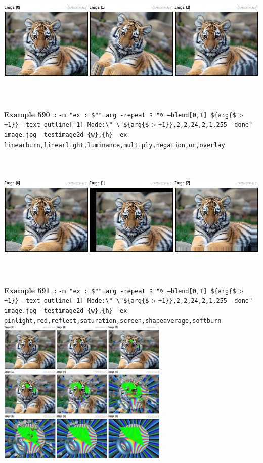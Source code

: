 \documentclass[a4paper,11pt,twoside]{book}
\begin{document}
\begin{center}
\\\includegraphics[keepaspectratio=true,height=7cm,width=\textwidth]{img/gmic_def590.jpg}\\
{\footnotesize \textbf{Example 590~:} \texttt{-m "ex : \$""=arg -repeat \$""\% --blend[0,1] \$\{arg\{\$$>$+1\}\} -text\_outline[-1] Mode:\textbackslash " \textbackslash "\$\{arg\{\$$>$+1\}\},2,2,24,2,1,255 -done" image.jpg -testimage2d \{w\},\{h\} -ex linearburn,linearlight,luminance,multiply,negation,or,overlay}}
\\\includegraphics[keepaspectratio=true,height=7cm,width=\textwidth]{img/gmic_def591.jpg}\\
{\footnotesize \textbf{Example 591~:} \texttt{-m "ex : \$""=arg -repeat \$""\% --blend[0,1] \$\{arg\{\$$>$+1\}\} -text\_outline[-1] Mode:\textbackslash " \textbackslash "\$\{arg\{\$$>$+1\}\},2,2,24,2,1,255 -done" image.jpg -testimage2d \{w\},\{h\} -ex pinlight,red,reflect,saturation,screen,shapeaverage,softburn}}
\\\includegraphics[keepaspectratio=true,height=7cm,width=\textwidth]{img/gmic_def592.jpg}\\

\end{center}
\end{document}
